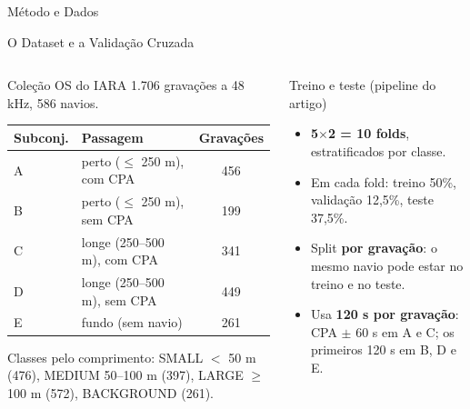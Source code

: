 \documentclass[aspectratio=169]{beamer}
\begin{document}
\begin{frame}
    \centering
    \huge Método e Dados
\end{frame}

\begin{frame}{O Dataset e a Validação Cruzada}
    \begin{columns}[t]
        \begin{block}{\small Coleção OS do IARA}
            \scriptsize
            1.706 gravações a 48 kHz, 586 navios.
            \vspace{0.05cm}

            \centering
            \begin{tabular}{llc}
            \toprule
            Subconj. & Passagem & Gravações \\
            \midrule
            A & perto ($\leq$ 250 m), com CPA & 456 \\
            B & perto ($\leq$ 250 m), sem CPA & 199 \\
            C & longe (250--500 m), com CPA & 341 \\
            D & longe (250--500 m), sem CPA & 449 \\
            E & fundo (sem navio) & 261 \\
            \bottomrule
            \end{tabular}
            \vspace{0.05cm}

            \raggedright
            Classes pelo comprimento: SMALL $<$ 50 m (476), MEDIUM 50--100 m (397), LARGE $\geq$ 100 m (572), BACKGROUND (261).
        \end{block}
        \begin{block}{\small Treino e teste (pipeline do artigo)}
            \scriptsize
            \begin{itemize}
                \setlength{\itemsep}{1pt}
                \item \textbf{5$\times$2 = 10 folds}, estratificados por classe.
                \item Em cada fold: treino 50\%, validação 12,5\%, teste 37,5\%.
                \item Split \textbf{por gravação}: o mesmo navio pode estar no treino e no teste.
                \item Usa \textbf{120 s por gravação}: CPA $\pm$ 60 s em A e C; os primeiros 120 s em B, D e E.
            \end{itemize}
        \end{block}
    \end{columns}
\end{frame}
\end{document}

